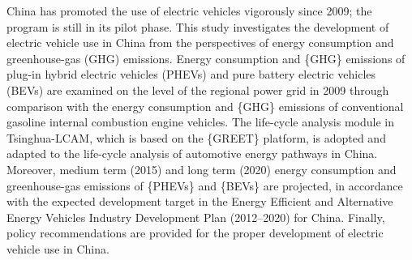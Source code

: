 China has promoted the use of electric vehicles vigorously since 2009; the program is still in its pilot phase. This study investigates the development of electric vehicle use in China from the perspectives of energy consumption and greenhouse-gas (GHG) emissions. Energy consumption and \{GHG\} emissions of plug-in hybrid electric vehicles (PHEVs) and pure battery electric vehicles (BEVs) are examined on the level of the regional power grid in 2009 through comparison with the energy consumption and \{GHG\} emissions of conventional gasoline internal combustion engine vehicles. The life-cycle analysis module in Tsinghua-LCAM, which is based on the \{GREET\} platform, is adopted and adapted to the life-cycle analysis of automotive energy pathways in China. Moreover, medium term (2015) and long term (2020) energy consumption and greenhouse-gas emissions of \{PHEVs\} and \{BEVs\} are projected, in accordance with the expected development target in the Energy Efficient and Alternative Energy Vehicles Industry Development Plan (2012–2020) for China. Finally, policy recommendations are provided for the proper development of electric vehicle use in China.